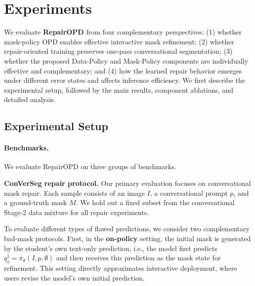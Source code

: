 %

\section{Experiments}
\label{sec:experiments}

We evaluate \textbf{RepairOPD} from four complementary perspectives:
(1) whether mask-policy OPD enables effective interactive mask refinement;
(2) whether repair-oriented training preserves one-pass conversational segmentation;
(3) whether the proposed Data-Policy and Mask-Policy components are individually effective and complementary; and
(4) how the learned repair behavior emerges under different error states and affects inference efficiency.
We first describe the experimental setup, followed by the main results, component ablations, and detailed analysis.


\subsection{Experimental Setup}
\label{sec:exp_setup}

\paragraph{Benchmarks.}
We evaluate RepairOPD on three groups of benchmarks.

\noindent\textbf{ConVerSeg repair protocol.}
Our primary evaluation focuses on conversational mask repair.
Each sample consists of an image $I$, a conversational prompt $p$, and a ground-truth mask $M$.
We hold out a fixed subset from the conversational Stage-2 data mixture for all repair experiments.

To evaluate different types of flawed predictions, we consider two complementary bad-mask protocols.
First, in the \textbf{on-policy} setting, the initial mask is generated by the student's own text-only prediction,
i.e., the model first predicts $q_s^{1}=\pi_{\theta}(I,p,\emptyset)$ and then receives this prediction as the mask state for refinement.
This setting directly approximates interactive deployment, where users revise the model's own initial prediction.

